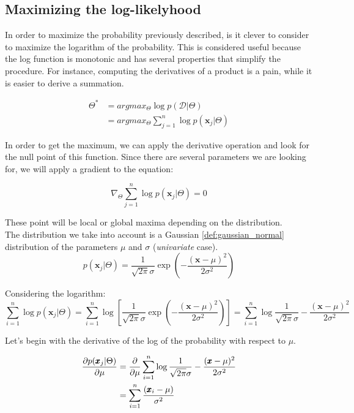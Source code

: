     \subsection{Maximizing the log-likelyhood}
        In order to maximize the probability previously described, is it clever to consider to maximize the logarithm of the probability.
        This is considered useful because the log function is monotonic and has several properties that simplify the procedure. For instance, computing the derivatives of a product is a pain, while it is easier to derive a summation.
        
        \begin{align*}
    		\Theta^* &= argmax_{\Theta} \log p(\mathcal{D} | \Theta)\\
    		&= argmax_\Theta \sum_{j=1}^n \log p(\pmb{x}_j|\Theta)
    	\end{align*}    
        
        In order to get the maximum, we can apply the derivative operation and look for the null point of this function. Since there are several parameters we are looking for, we will apply a gradient to the equation:
        
        \begin{equation}
            \nabla _\Theta \sum_{j=1} ^n \log p(\pmb{x}_j|\Theta) = 0
        \end{equation}
        
        These point will be local or global maxima depending on the distribution.\\
        
        The distribution we take into account is a Gaussian \ref{def:gaussian_normal} distribution of the parameters $\mu$ and $\sigma$ (\textit{univariate} case).
        $$p(\pmb{x}_j|\Theta) = \frac{1}{\sqrt{2\pi}\sigma} \exp{(-\frac{(\pmb{x}-\mu)^2}{2\sigma ^2})} $$
        
        Considering the logarithm:
        $$\sum_{i=1}^n \log p(\pmb{x}_j|\Theta) = \sum_{i=1}^n \log{ \left[ \frac{1}{\sqrt{2\pi}\sigma} \exp{(-\frac{(\pmb{x}-\mu)^2}{2\sigma ^2})} \right] } = \sum_{i=1}^n \log{ \frac{1}{\sqrt{2\pi}\sigma}}-\frac{(\pmb{x}-\mu)^2}{2\sigma ^2}$$
        
        Let's begin with the derivative of the log of the probability with respect to $\mu$.
        
        \begin{align*}
        \pdv {p(\pmb{x}_j|\Theta)}{\mu} &= \pdv{}{\mu} \sum_{i=1}^n \log \frac{1}{\sqrt{2\pi}\sigma} - \frac{(\pmb{x}-\mu)^2}{2\sigma^2}\\
    	&= \sum_{i=1} ^n \frac{(\pmb{x}_i - \mu)}{\sigma^2}
    	\end{align*}
    	
